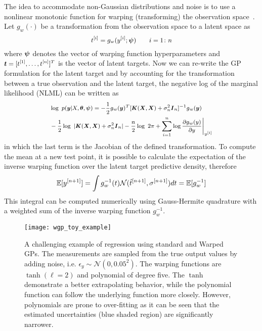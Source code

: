 \documentclass[letterpaper, 10 pt, journal, twoside]{IEEEtran}  %
\begin{document}
The idea to accommodate non-Gaussian distributions and noise is to use a nonlinear monotonic function for warping (transforming) the observation space~\cite{snelson2004warped}. Let $g_w(\cdot)$ be a transformation from the observation space to a latent space as
\begin{equation}
\small
 \label{eq:warptrans}
 t^{[i]} = g_w(y^{[i]}; \boldsymbol\psi) \qquad i=1\colon n
\end{equation}
where $\small{\boldsymbol\psi}$ denotes the vector of warping function hyperparameters and $\small{\boldsymbol t = [t^{[1]},\dots,t^{[n]}]^T}$ is the vector of latent targets. Now we can re-write the GP formulation for the latent target and by accounting for the transformation between a true observation and the latent target, the negative log of the marginal likelihood (NLML) can be written as
\begin{equation}
\footnotesize
\label{warpednlml}
\begin{split}
	&\log\ p(\boldsymbol y|X,\boldsymbol\theta,\boldsymbol\psi) = -\frac{1}{2}g_w(\boldsymbol y)^{T} [\boldsymbol K(\boldsymbol X,\boldsymbol X)+\sigma_n^2 \boldsymbol I_{n}]^{-1} g_w(\boldsymbol y) \\& -\frac{1}{2}\log\ \arrowvert \boldsymbol K(\boldsymbol X,\boldsymbol X)+\sigma_n^2 \boldsymbol I_{n} \arrowvert-\frac{n}{2}\log\ 2\pi + \sum_{i=1}^{n}\log\frac{\partial g_w(y)}{\partial y}\Bigg|_{y^{[i]}}
\end{split}
\end{equation}
in which the last term is the Jacobian of the defined transformation. To compute the mean at a new test point, it is possible to calculate the expectation of the inverse warping function over the latent target predictive density, therefore
\begin{equation}
\small
 \label{eq:expinv}
 \mathbb{E}[y^{[n+1]}] = \int g_w^{-1}(t)\mathcal{N}(\hat{t}^{[n+1]},\sigma^{[n+1]}) dt = \mathbb{E}[g_w^{-1}]
\end{equation}
This integral can be computed numerically using Gauss-Hermite quadrature with a weighted sum of the inverse warping function $g_w^{-1}$.

\begin{figure}
  \centering 
  \texttt{[image: wgp\_toy\_example]}
  \caption{A challenging example of regression using standard and Warped GPs. The measurements are sampled from the true output values by adding noise, i.e. $\epsilon_y \sim \mathcal{N}(0,0.05^2)$. The warping functions are $\tanh (\ell=2)$ and polynomial of degree five. The $\tanh$ demonstrate a better extrapolating behavior, while the polynomial function can follow the underlying function more closely. However, polynomials are prone to over-fitting as it can be seen that the estimated uncertainties (blue shaded region) are significantly narrower.}
  \label{fig:toy_eg}
\end{figure}
\end{document}
